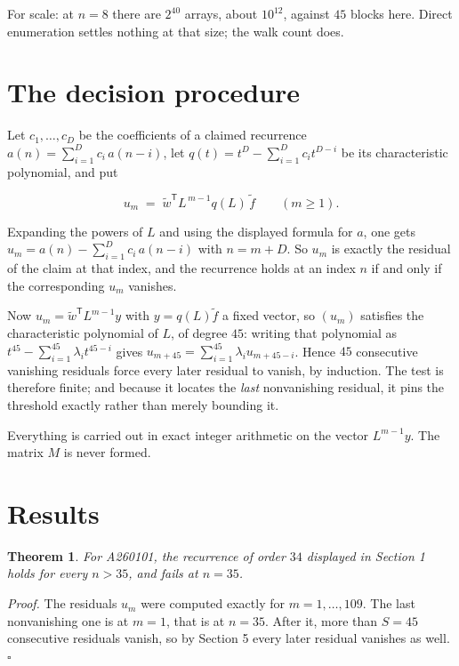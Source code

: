 \documentclass[11pt]{article}
\newtheorem{theorem}{Theorem}
\theoremstyle{definition}
\begin{document}
For scale: at $n = 8$ there are $2^{40}$ arrays, about $10^{12}$, against $45$ blocks here. Direct enumeration settles nothing at that size; the walk count does.

\section{The decision procedure}

Let $c_1,\dots,c_D$ be the coefficients of a claimed recurrence $a(n) = \sum_{i=1}^{D} c_i\,a(n-i)$, let $q(t) = t^{D} - \sum_{i=1}^{D} c_i t^{D-i}$ be its characteristic polynomial, and put

\[u_m \;=\; \tilde w^{\mathsf T} L^{\,m-1} q(L)\,\tilde f \qquad (m \ge 1).\]

Expanding the powers of $L$ and using the displayed formula for $a$, one gets $u_m = a(n) - \sum_{i=1}^{D} c_i\,a(n-i)$ with $n = m + D$. So $u_m$ is exactly the residual of the claim at that index, and the recurrence holds at an index $n$ if and only if the corresponding $u_m$ vanishes.

Now $u_m = \tilde w^{\mathsf T} L^{m-1} y$ with $y = q(L)\tilde f$ a fixed vector, so $(u_m)$ satisfies the characteristic polynomial of $L$, of degree $45$: writing that polynomial as $t^{45} - \sum_{i=1}^{45} \lambda_i t^{45-i}$ gives $u_{m+45} = \sum_{i=1}^{45} \lambda_i u_{m+45-i}$. Hence $45$ consecutive vanishing residuals force every later residual to vanish, by induction. The test is therefore finite; and because it locates the {\itshape last} nonvanishing residual, it pins the threshold exactly rather than merely bounding it.

Everything is carried out in exact integer arithmetic on the vector $L^{m-1}y$. The matrix $M$ is never formed.

\section{Results}

\begin{theorem} For A260101, the recurrence of order $34$ displayed in Section 1 holds for every $n > 35$, and fails at $n = 35$.\end{theorem}

{\itshape Proof.} The residuals $u_m$ were computed exactly for $m = 1,\dots,109$. The last nonvanishing one is at $m = 1$, that is at $n = 35$. After it, more than $S = 45$ consecutive residuals vanish, so by Section 5 every later residual vanishes as well. $\square$
\end{document}
